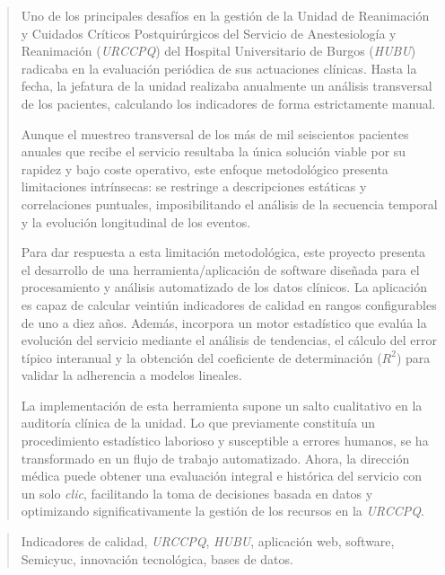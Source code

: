 \documentclass[a4paper,12pt,twoside]{memoir}
\begin{document}
\newpage\null\thispagestyle{empty}\newpage




\frontmatter

\renewcommand*\abstractname{Resumen}
\begin{abstract}
Uno de los principales desafíos en la gestión de la Unidad de Reanimación y Cuidados Críticos Postquirúrgicos del Servicio de Anestesiología y Reanimación (\textit{URCCPQ}) del Hospital Universitario de Burgos (\textit{HUBU}) radicaba en la evaluación periódica de sus actuaciones clínicas. Hasta la fecha, la jefatura de la unidad realizaba anualmente un análisis transversal de los pacientes, calculando los indicadores de forma estrictamente manual. 

Aunque el muestreo transversal de los más de mil seiscientos pacientes anuales que recibe el servicio resultaba la única solución viable por su rapidez y bajo coste operativo, este enfoque metodológico presenta limitaciones intrínsecas: se restringe a descripciones estáticas y correlaciones puntuales, imposibilitando el análisis de la secuencia temporal y la evolución longitudinal de los eventos.

Para dar respuesta a esta limitación metodológica, este proyecto presenta el desarrollo de una herramienta/aplicación de software diseñada para el procesamiento y análisis automatizado de los datos clínicos. La aplicación es capaz de calcular veintiún indicadores de calidad en rangos configurables de uno a diez años. Además, incorpora un motor estadístico que evalúa la evolución del servicio mediante el análisis de tendencias, el cálculo del error típico interanual y la obtención del coeficiente de determinación ($R^2$) para validar la adherencia a modelos lineales.

La implementación de esta herramienta supone un salto cualitativo en la auditoría clínica de la unidad. Lo que previamente constituía un procedimiento estadístico laborioso y susceptible a errores humanos, se ha transformado en un flujo de trabajo automatizado. Ahora, la dirección médica puede obtener una evaluación integral e histórica del servicio con un solo \textit{clic}, facilitando la toma de decisiones basada en datos y optimizando significativamente la gestión de los recursos en la \textit{URCCPQ}.
\end{abstract}

\renewcommand*\abstractname{Descriptores}
\begin{abstract}
Indicadores de calidad, \textit{URCCPQ}, \textit{HUBU}, aplicación web, software, Semicyuc, innovación tecnológica, bases de datos.
\end{abstract}
\end{document}
